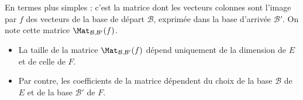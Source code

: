 \documentclass[class=report,crop=false]{standalone}
\begin{document}
En termes plus simples : c'est la matrice dont les vecteurs colonnes
sont l'image par $f$ des vecteurs de la base de départ $\mathcal{B}$,
exprimée dans la base d'arrivée $\mathcal{B}'$.
On note cette matrice $\Mat_{\mathcal{B},\mathcal{B}'}(f)$.



\begin{remarque*}
\sauteligne
\begin{itemize}
  \item La taille de la matrice $\Mat_{\mathcal{B},\mathcal{B}'}(f)$ dépend
  uniquement de la dimension de $E$ et de celle de $F$.

  \item Par contre, les coefficients de la matrice dépendent
  du choix de la base  $\mathcal{B}$ de $E$ et de la base $\mathcal{B}'$ de $F$.
\end{itemize}
\end{remarque*}
\end{document}
